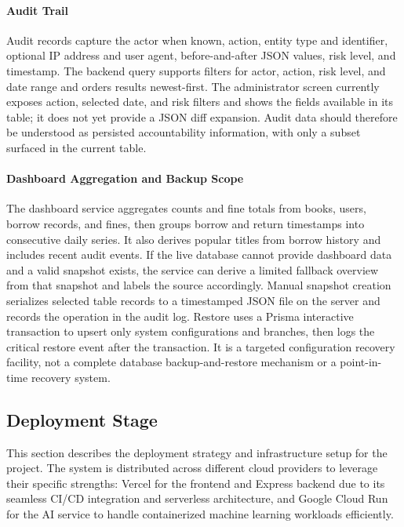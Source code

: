\paragraph{Audit Trail}
Audit records capture the actor when known, action, entity type and identifier, optional IP address and user agent, before-and-after JSON values, risk level, and timestamp. The backend query supports filters for actor, action, risk level, and date range and orders results newest-first. The administrator screen currently exposes action, selected date, and risk filters and shows the fields available in its table; it does not yet provide a JSON diff expansion. Audit data should therefore be understood as persisted accountability information, with only a subset surfaced in the current table.

\paragraph{Dashboard Aggregation and Backup Scope}
The dashboard service aggregates counts and fine totals from books, users, borrow records, and fines, then groups borrow and return timestamps into consecutive daily series. It also derives popular titles from borrow history and includes recent audit events. If the live database cannot provide dashboard data and a valid snapshot exists, the service can derive a limited fallback overview from that snapshot and labels the source accordingly. Manual snapshot creation serializes selected table records to a timestamped JSON file on the server and records the operation in the audit log. Restore uses a Prisma interactive transaction to upsert only system configurations and branches, then logs the critical restore event after the transaction. It is a targeted configuration recovery facility, not a complete database backup-and-restore mechanism or a point-in-time recovery system.


\subsection{Deployment Stage}

This section describes the deployment strategy and infrastructure setup for the project. The system is distributed across different cloud providers to leverage their specific strengths: Vercel for the frontend and Express backend due to its seamless CI/CD integration and serverless architecture, and Google Cloud Run for the AI service to handle containerized machine learning workloads efficiently.

